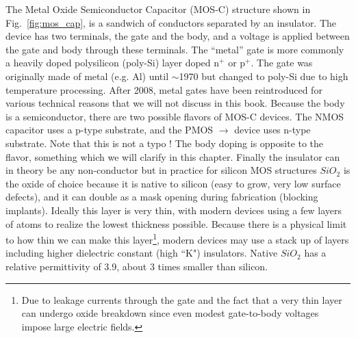 The  Metal Oxide Semiconductor Capacitor (MOS-C) structure shown in Fig.~\ref{fig:mos_cap},  is a sandwich of conductors separated by an insulator.  The device has two terminals, the gate and the body, and a voltage is applied between the gate and body through these terminals.  The  “metal” gate is more commonly a heavily doped polysilicon (poly-Si) layer doped n$^+$ or p$^+$.  The gate was originally made of metal (e.g. Al) until $\sim$1970 but changed to poly-Si due to high temperature processing. After 2008, metal gates have been reintroduced for various technical reasons that we will not discuss in this book.  Because the body is a semiconductor, there are two possible flavors of MOS-C devices.  The NMOS capacitor uses a  p-type substrate, and the PMOS  $\rightarrow$ device uses n-type substrate.  Note that this is not a typo !  The body doping is opposite to the flavor, something which we will clarify in this chapter.  Finally the insulator can in theory be any non-conductor but in practice for silicon MOS structures $SiO_2$ is the oxide of choice because it is native to silicon (easy to grow, very low surface defects), and it can double as a mask opening during fabrication (blocking implants).  Ideally this layer is very thin, with modern devices using a few layers of atoms to realize the lowest thickness possible.  Because there is a physical limit to how thin we can make this layer\footnote{Due to leakage currents through the gate and the fact that a very thin layer can undergo oxide breakdown since even modest gate-to-body voltages impose large electric fields.}, modern devices may use a stack up of layers including higher dielectric constant (high ``K") insulators.  Native $SiO_2$ has a relative permittivity of 3.9, about 3 times smaller than silicon.
